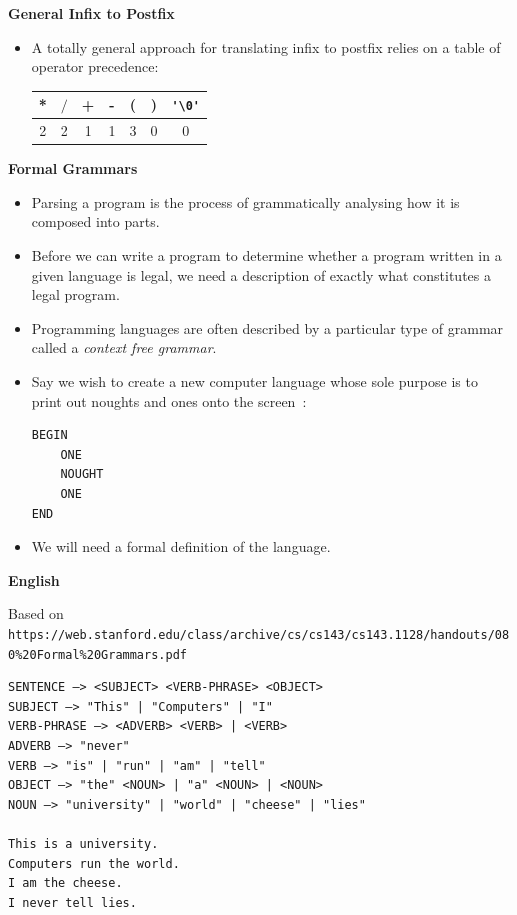 \newpage
{\samepage
\begin{center}
{\Large{\bf General Infix to Postfix}}
\end{center}
\begin{itemize}
\item A totally general approach for translating infix to postfix relies on
a table of operator precedence:
{\large
\begin{center}
\begin{tabular}{|c|c|c|c|c|c|c|}\hline
*&$/$&+&-&(&)&\verb^'\0'^ \\ \hline
2&2&1&1&3&0&0\\\hline
\end{tabular}
\end{center}
}
\end{itemize}
}

\newpage
{\samepage
\begin{center}
{\Large{\bf Formal Grammars}}
\end{center}
\begin{itemize}

\item Parsing a program is the process of grammatically analysing how it is composed into parts.

\item Before we can write a program to determine whether a program
written in a given language is legal, we need a description of exactly
what constitutes a legal program.

\item Programming languages are often described by a particular type of
grammar called a {\it context free grammar}.

\item Say we wish to create a new computer language whose sole purpose
is to print out noughts and ones onto the screen~:

\begin{verbatim}
BEGIN
    ONE
    NOUGHT
    ONE
END
\end{verbatim}
\item We will need a formal definition of the language.
\end{itemize}
}

\newpage
{\samepage
\begin{center}
{\Large{\bf English}}
\end{center}
{\small Based on \verb^https://web.stanford.edu/class/archive/cs/cs143/cs143.1128/handouts/080%20Formal%20Grammars.pdf^}
\begin{verbatim}
SENTENCE –> <SUBJECT> <VERB-PHRASE> <OBJECT>
SUBJECT –> "This" | "Computers" | "I"
VERB-PHRASE –> <ADVERB> <VERB> | <VERB>
ADVERB –> "never"
VERB –> "is" | "run" | "am" | "tell"
OBJECT –> "the" <NOUN> | "a" <NOUN> | <NOUN>
NOUN –> "university" | "world" | "cheese" | "lies"

This is a university.
Computers run the world.
I am the cheese.
I never tell lies.
\end{verbatim}
}

